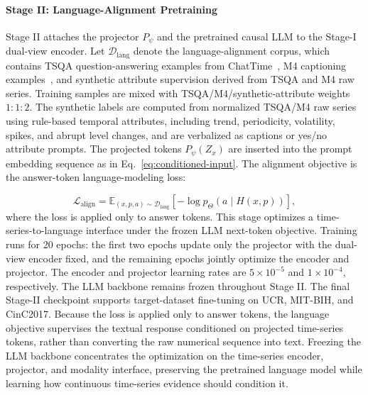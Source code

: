 \documentclass[10pt,journal,compsoc]{IEEEtran}
\begin{document}
\paragraph{Stage II: Language-Alignment Pretraining}
Stage II attaches the projector $P_\psi$ and the pretrained causal LLM to the Stage-I dual-view encoder.
Let $\mathcal{D}_{\mathrm{lang}}$ denote the language-alignment corpus, which contains TSQA question-answering examples from ChatTime~\cite{wang2025chattime}, M4 captioning examples~\cite{makridakis2020m4}, and synthetic attribute supervision derived from TSQA and M4 raw series.
Training samples are mixed with TSQA/M4/synthetic-attribute weights $1:1:2$.
The synthetic labels are computed from normalized TSQA/M4 raw series using rule-based temporal attributes, including trend, periodicity, volatility, spikes, and abrupt level changes, and are verbalized as captions or yes/no attribute prompts.
The projected tokens $P_\psi(Z_x)$ are inserted into the prompt embedding sequence as in Eq.~\eqref{eq:conditioned-input}.
The alignment objective is the answer-token language-modeling loss:

\begin{equation}
\label{eq:language-alignment-loss}
\mathcal{L}_{\mathrm{align}}
=
\mathbb{E}_{(x,p,a)\sim\mathcal{D}_{\mathrm{lang}}}
\left[
-\log p_{\Theta}(a\mid H(x,p))
\right],
\end{equation}
where the loss is applied only to answer tokens.
This stage optimizes a time-series-to-language interface under the frozen LLM next-token objective.
Training runs for 20 epochs: the first two epochs update only the projector with the dual-view encoder fixed, and the remaining epochs jointly optimize the encoder and projector.
The encoder and projector learning rates are $5\times10^{-5}$ and $1\times10^{-4}$, respectively.
The LLM backbone remains frozen throughout Stage II.
The final Stage-II checkpoint supports target-dataset fine-tuning on UCR, MIT-BIH, and CinC2017.
Because the loss is applied only to answer tokens, the language objective supervises the textual response conditioned on projected time-series tokens, rather than converting the raw numerical sequence into text.
Freezing the LLM backbone concentrates the optimization on the time-series encoder, projector, and modality interface, preserving the pretrained language model while learning how continuous time-series evidence should condition it.
\end{document}
